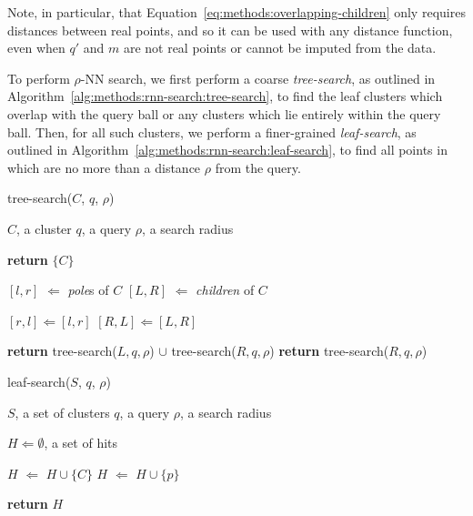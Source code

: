 Note, in particular, that Equation~\ref{eq:methods:overlapping-children} only requires distances between real points, and so it can be used with any distance function, even when $q'$ and $m$ are not real points or cannot be imputed from the data.

To perform $\rho$-NN search, we first perform a coarse \emph{tree-search}, as outlined in Algorithm~\ref{alg:methods:rnn-search:tree-search}, to find the leaf clusters which overlap with the query ball or any clusters which lie entirely within the query ball.
Then, for all such clusters, we perform a finer-grained \emph{leaf-search}, as outlined in Algorithm~\ref{alg:methods:rnn-search:leaf-search}, to find all points in which are no more than a distance $\rho$ from the query.

\begin{algorithm} 
    \caption{tree-search($C$, $q$, $\rho$)} 
    \label{alg:methods:rnn-search:tree-search} 
    \begin{algorithmic}
        \REQUIRE $C$, a cluster
        \REQUIRE $q$, a query
        \REQUIRE $\rho$, a search radius

            \STATE \textbf{return} $\{C\}$
        \ELSE

            \STATE $[l, r]$ $\Leftarrow$ \emph{pole}s of $C$
            \STATE $[L, R]$ $\Leftarrow$ \emph{children} of $C$

                \STATE $[r, l] \Leftarrow [l, r]$
                \STATE $[R, L] \Leftarrow [L, R]$
            \ENDIF

                \STATE \textbf{return} tree-search($L, q, \rho$) $\cup$ tree-search($R, q, \rho$)
            \ELSE
                \STATE \textbf{return} tree-search($R, q, \rho$)
            \ENDIF
        \ENDIF
    \end{algorithmic}
\end{algorithm}

\begin{algorithm} 
    \caption{leaf-search($S$, $q$, $\rho$)} 
    \label{alg:methods:rnn-search:leaf-search} 
    \begin{algorithmic}
        \REQUIRE $S$, a set of clusters
        \REQUIRE $q$, a query
        \REQUIRE $\rho$, a search radius

        \STATE $H \Leftarrow \emptyset$, a set of hits

                \STATE $H$ $\Leftarrow$ $H \cup \{C\}$
            \ELSE
                        \STATE $H$ $\Leftarrow$ $H \cup \{p\}$
                    \ENDIF
                \ENDFOR
            \ENDIF
        \ENDFOR

        \STATE \textbf{return} $H$
    \end{algorithmic}
\end{algorithm}

